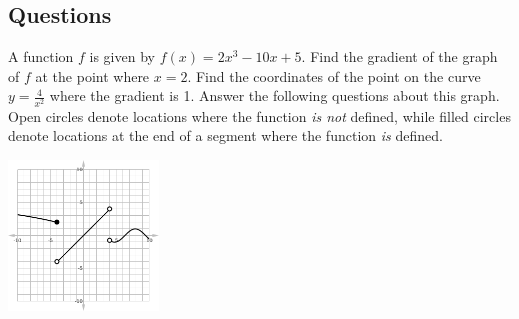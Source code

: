 \subsection*{Questions}
\begin{questions}
  \question A function $ f $ is given by $ f(x) = 2x^3 - 10x + 5 $. Find the gradient of the graph of $ f $ at the point where $ x = 2 $.
  \question Find the coordinates of the point on the curve $ y = \frac{4}{x^2} $ where the gradient is 1.
  \question Answer the following questions about this graph. Open circles denote locations
            where the function \emph{is not} defined, while filled circles denote locations at
            the end of a segment where the function \emph{is} defined.
            \begin{center}\includegraphics[width=0.3\textwidth]{fungraph}\end{center}
\end{questions}


